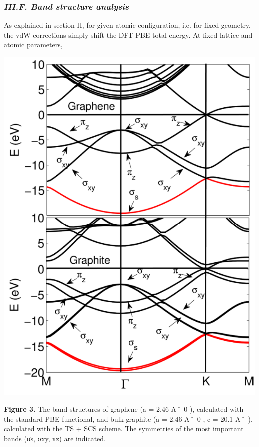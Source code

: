 \documentclass{article}
\begin{document}
\subsubsection{\textit{III.F. Band structure analysis}}

As explained in section II, for given atomic configuration, i.e. for fixed geometry, the vdW corrections simply shift the DFT-PBE total energy. At fixed lattice and atomic parameters,


\includegraphics{_page_8_Figure_7.png}


\textbf{Figure 3.} The band structures of graphene (a = 2.46 A˚ 0 ), calculated with the standard PBE functional, and bulk graphite (a = 2.46 A˚ 0 , c = 20.1 A˚ ), calculated with the TS + SCS scheme. The symmetries of the most important bands (σs, σxy, πz) are indicated.
\end{document}
